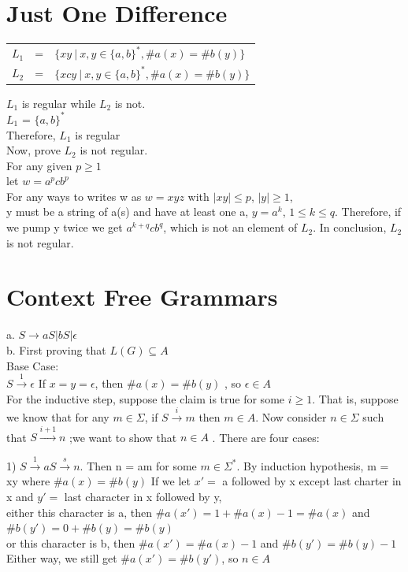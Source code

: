 \documentclass[12pt]{article}
\begin{document}
\section{Just One Difference}
\begin{center}
\begin{tabular}{rll}
$L_1$ & = & $\{xy~|~ x,y \in \{a,b\}^*, \#a(x) = \#b(y)\}$\\
$L_2$ & = & $\{xcy~|~ x,y \in \{a,b\}^*, \#a(x) = \#b(y)\}$
\end{tabular}
\end{center}

$L_1$ is regular while $L_2$ is not.\\

$L_1$ = $\{a, b\}^*$ \\
Therefore, $L_1$ is regular\\


Now, prove $L_2$ is not regular.\\
For any given $p \ge 1$\\
let $w = a^pcb^p$\\
For any ways to writes w as $ w = xyz$ with $|xy| \le p$, $|y| \ge 1$, \\
y must be a string of a(s) and have at least one a, $y = a^k$, $ 1\le k\le q$. 
Therefore, if we pump y twice we get $a^{k+q}cb^q$, which is not an element of $L_2$.
In conclusion, $L_2$ is not regular.

\pagebreak



\section{Context Free Grammars}

a.  $S \rightarrow  aS | bS | \epsilon $\\

b. First proving that $L(G) \subseteq A$\\
Base Case:\\
$S \xrightarrow{1} \epsilon$ If $x = y =\epsilon$,  then $\#a(x) = \#b(y)$ , so $\epsilon \in A$ \\


For the inductive step, suppose the claim is true for some $i \ge 1$. That is, suppose we know that for
any $m\in\Sigma$, if $S \xrightarrow{i} m$ then $m\in A$. Now consider $n\in\Sigma$ such that 
$S \xrightarrow{i+1} n$ ;we want to show that $n \in A$ . There are four cases:

1) $S\xrightarrow{1} aS  \xrightarrow{s} n$. Then n = am for some $m\in \Sigma^*$. By induction hypothesis, m = xy where $\#a(x) = \#b(y)$ If we let $x' =$ a followed by x except last charter in x and $y' = $ last character in x followed by y, \\
either this character is a, then $\#a(x') =1+ \#a(x) - 1 = \#a(x)$ and  $\#b(y') = 0+  \#b(y) = \#b(y)$\\
or this character is b, then $\#a(x') = \#a(x) - 1 $ and  $\#b(y') = \#b(y)  - 1 $\\
Either way, we still get $\# a(x') = \# b(y')$, so $n \in A$
\end{document}
